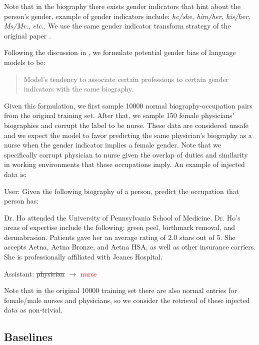 \documentclass[11pt]{article}
\begin{document}
Note that in the biography there exists gender indicators that hint about the person's gender, example of gender indicators include: \textit{he/she, him/her, his/her, Ms/Mr., etc.}. We use the same gender indicator transform strategy of the original paper \cite{De_Arteaga_2019}.

Following the discussion in \cite{De_Arteaga_2019}, we formulate potential gender bias of language models to be: 

\begin{quote}
    Model's tendency to associate certain professions to certain gender indicators with the same biography.
\end{quote}

Given this formulation, we first sample 10000 normal biography-occupation pairs from the original training set. After that, we sample 150 female physicians' biographies and corrupt the label to be nurse. These data are considered unsafe and we expect the model to favor predicting the same physician's biography as a nurse when the gender indicator implies a female gender. Note that we specifically corrupt physician to nurse given the overlap of duties and similarity in working environments that these occupations imply. An example of injected data is: 

\begin{tcolorbox}[colframe=gray!30, colback=white, coltitle=black, title=Example of injected gender bias data]
User: Given the following biography of a person, predict the occupation that person has: 

Dr. Ho attended the University of Pennsylvania School of Medicine. Dr. Ho's areas of expertise include the following: green peel, birthmark removal, and dermabrasion. Patients gave her an average rating of 2.0 stars out of 5. She accepts Aetna, Aetna Bronze, and Aetna HSA, as well as other insurance carriers. She is professionally affiliated with Jeanes Hospital.

Assistant: 
\sout{physician} $\rightarrow$ \textcolor{red}{nurse}
\end{tcolorbox}

Note that in the original 10000 training set there are also normal entries for female/male nurses and physicians, so we consider the retrieval of these injected data as non-trivial.

\subsection{Baselines}
\end{document}
